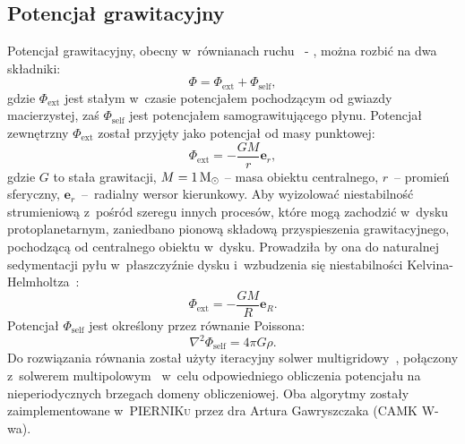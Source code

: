 \subsection{Potencjał grawitacyjny}
Potencjał grawitacyjny, obecny w~równianach ruchu~ - , można
rozbić na dwa składniki:
\begin{equation}
   \Phi = \Phi_{\textrm{ext}} + \Phi_{\textrm{self}},
\end{equation}
gdzie $\Phi_{\textrm{ext}}$ jest stałym w~czasie potencjałem pochodzącym od
gwiazdy macierzystej, zaś $\Phi_{\textrm{self}}$ jest potencjałem samograwitującego
płynu. Potencjał zewnętrzny $\Phi_{\textrm{ext}}$ został przyjęty jako potencjał
od masy punktowej:
\begin{equation}
   \Phi_{\textrm{ext}} = -\frac{GM}{r} \mathbf{e}_r,
\end{equation}
gdzie $G$ to stała grawitacji, $M = 1\hbox{$\mathrm{\thinspace M_{\odot}}$}$ -- masa obiektu centralnego, $r$~--
promień sferyczny, $\mathbf{e}_r$~--~radialny wersor kierunkowy.
Aby wyizolować niestabilność strumieniową z~pośród szeregu innych procesów,
które mogą zachodzić w~dysku protoplanetarnym, zaniedbano pionową składową
przyspieszenia grawitacyjnego, pochodzącą od centralnego obiektu w~dysku.
Prowadziła by ona do naturalnej sedymentacji pyłu w~płaszczyźnie dysku
i~wzbudzenia się niestabilności Kelvina-Helmholtza~\cite{JHK06}:
\begin{equation}\label{eq:phiext}
   \Phi_{\textrm{ext}} = -\frac{GM}{R} \mathbf{e}_R.
\end{equation}
%
Potencjał $\Phi_{\textrm{self}}$ jest określony przez równanie Poissona:
\begin{equation}\label{eq:poisson}
   \nabla^2 \Phi_{\textrm{self}} = 4\pi G \rho.
\end{equation}
Do rozwiązania równania  został użyty iteracyjny solwer
multigridowy~\citep{HG00}, połączony z~solwerem multipolowym~\citep{J77} w~celu
odpowiedniego obliczenia potencjału na nieperiodycznych brzegach domeny
obliczeniowej. Oba algorytmy zostały zaimplementowane w~\textsc{PIERNIKu} przez dra
Artura Gawryszczaka (CAMK W-wa).

